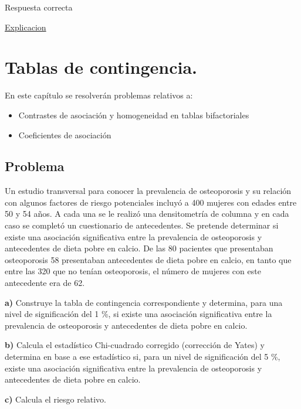 \documentclass[
]{book}
\providecommand{\tightlist}{%
  \setlength{\itemsep}{0pt}\setlength{\parskip}{0pt}}
\begin{document}
Respuesta correcta

\href{https://1fjmanzano.github.io/bioestadistica/relaci\%C3\%B3n-entre-variables-nume\%CC\%81ricas.html\#coeficiente-de-correlacio\%CC\%81n}{Explicacion}

\hypertarget{tablas-de-contingencia.}{%
\chapter{Tablas de contingencia.}\label{tablas-de-contingencia.}}

En este capítulo se resolverán problemas relativos a:

\begin{itemize}
\tightlist
\item
  Contrastes de asociación y homogeneidad en tablas bifactoriales
\item
  Coeficientes de asociación
\end{itemize}

\hypertarget{problema-15}{%
\section{Problema}\label{problema-15}}

Un estudio transversal para conocer la prevalencia de osteoporosis y su relación con algunos factores de riesgo potenciales incluyó a 400 mujeres con edades entre 50 y 54 años. A cada una se le realizó una densitometría de columna y en cada caso se completó un cuestionario de antecedentes. Se pretende determinar si existe una asociación significativa entre la prevalencia de osteoporosis y antecedentes de dieta pobre en calcio. De las 80 pacientes que presentaban osteoporosis 58 presentaban antecedentes de dieta pobre en calcio, en tanto que entre las 320 que no tenían osteoporosis, el número de mujeres con este antecedente era de 62.

\textbf{a)} Construye la tabla de contingencia correspondiente y determina, para una nivel de significación del 1 \%, si existe una asociación significativa entre la prevalencia de osteoporosis y antecedentes de dieta pobre en calcio.

\textbf{b)} Calcula el estadístico Chi-cuadrado corregido (corrección de Yates) y determina en base a ese estadístico si, para un nivel de significación del 5 \%, existe una asociación significativa entre la prevalencia de osteoporosis y antecedentes de dieta pobre en calcio.

\textbf{c)} Calcula el riesgo relativo.
\end{document}
